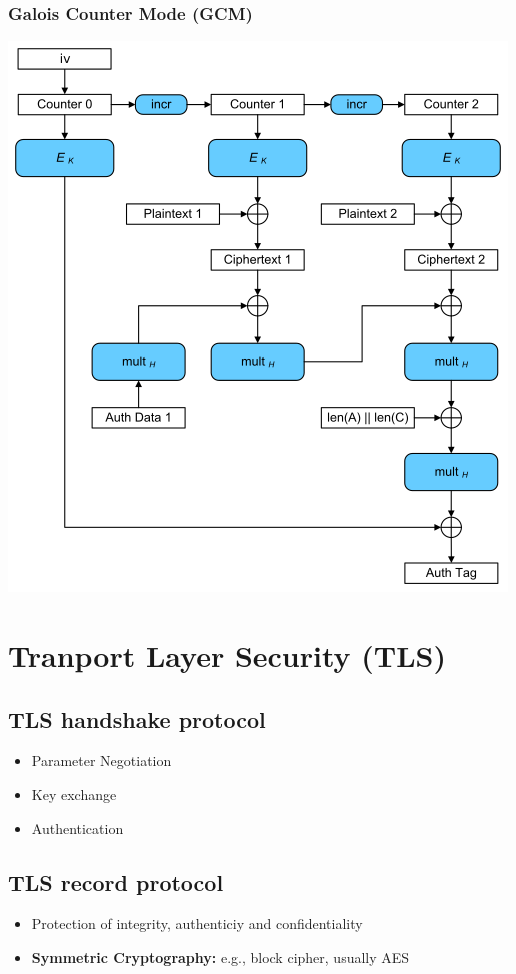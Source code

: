 \subsubsection{Galois Counter Mode (GCM)}
\begin{center}
  \includegraphics[width=0.5\columnwidth]{Resources/GCM-Galois_Counter_Mode_with_IV.svg.png}
\end{center}

\section{Tranport Layer Security (TLS)}
\subsection{TLS handshake protocol}
\begin{itemize}
  \item Parameter Negotiation
  \item Key exchange
  \item Authentication
\end{itemize}
\subsection{TLS record protocol}
\begin{itemize}
  \item Protection of integrity, authenticiy and confidentiality
  \item \textbf{Symmetric Cryptography:} e.g., block cipher, usually AES
\end{itemize}

